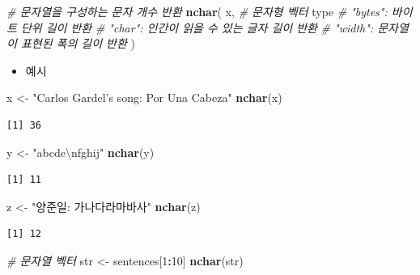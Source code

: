 \documentclass[
  11pt,
]{krantz}
\newenvironment{Shaded}{\begin{snugshade}}{\end{snugshade}}
\newcommand{\CharTok}[1]{\textcolor[rgb]{0.5,0.5,0.5}{#1}}
\newcommand{\CommentTok}[1]{\textcolor[rgb]{0.37,0.37,0.37}{\textit{#1}}}
\newcommand{\DecValTok}[1]{\textcolor[rgb]{0.06,0.06,0.06}{#1}}
\newcommand{\KeywordTok}[1]{\textcolor[rgb]{0.27,0.27,0.27}{\textbf{#1}}}
\newcommand{\NormalTok}[1]{#1}
\newcommand{\OperatorTok}[1]{\textcolor[rgb]{0.43,0.43,0.43}{\textbf{#1}}}
\newcommand{\StringTok}[1]{\textcolor[rgb]{0.5,0.5,0.5}{#1}}
\providecommand{\tightlist}{%
  \setlength{\itemsep}{0pt}\setlength{\parskip}{0pt}}
\begin{document}
\footnotesize

\begin{Shaded}
\begin{Highlighting}[]
\CommentTok{# 문자열을 구성하는 문자 개수 반환}
\KeywordTok{nchar}\NormalTok{(}
\NormalTok{  x, }\CommentTok{# 문자형 벡터}
\NormalTok{  type }\CommentTok{# "bytes": 바이트 단위 길이 반환}
       \CommentTok{# "char": 인간이 읽을 수 있는 글자 길이 반환}
       \CommentTok{# "width": 문자열이 표현된 폭의 길이 반환}
\NormalTok{)}
\end{Highlighting}
\end{Shaded}

\normalsize

\begin{itemize}
\tightlist
\item
  예시
\end{itemize}

\footnotesize

\begin{Shaded}
\begin{Highlighting}[]
\NormalTok{x <-}\StringTok{ "Carlos Gardel's song: Por Una Cabeza"}
\KeywordTok{nchar}\NormalTok{(x)}
\end{Highlighting}
\end{Shaded}

\begin{verbatim}
[1] 36
\end{verbatim}

\begin{Shaded}
\begin{Highlighting}[]
\NormalTok{y <-}\StringTok{ "abcde}\CharTok{\textbackslash{}n}\StringTok{fghij"}
\KeywordTok{nchar}\NormalTok{(y)}
\end{Highlighting}
\end{Shaded}

\begin{verbatim}
[1] 11
\end{verbatim}

\begin{Shaded}
\begin{Highlighting}[]
\NormalTok{z <-}\StringTok{ "양준일: 가나다라마바사"}
\KeywordTok{nchar}\NormalTok{(z)}
\end{Highlighting}
\end{Shaded}

\begin{verbatim}
[1] 12
\end{verbatim}

\begin{Shaded}
\begin{Highlighting}[]
\CommentTok{# 문자열 벡터}
\NormalTok{str <-}\StringTok{ }\NormalTok{sentences[}\DecValTok{1}\OperatorTok{:}\DecValTok{10}\NormalTok{]}
\KeywordTok{nchar}\NormalTok{(str)}
\end{Highlighting}
\end{Shaded}
\end{document}
